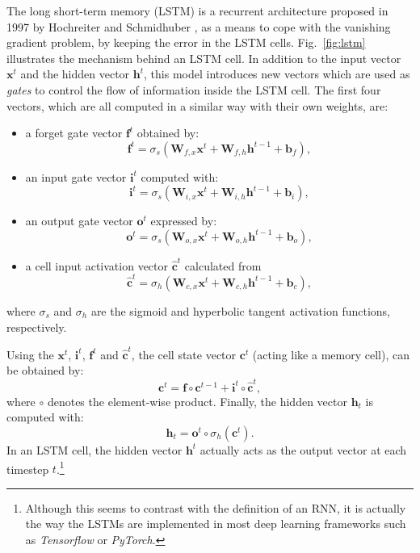 The long short-term memory (LSTM) is a recurrent architecture proposed in 1997 by Hochreiter and Schmidhuber \cite{hochreiter_long_1997}, as a means to cope with the vanishing gradient problem, by keeping the error in the LSTM cells. Fig.~\ref{fig:lstm} illustrates the mechanism behind an LSTM cell. In addition to the input vector $\mathbf{x}^t$ and the hidden vector $\mathbf{h}^t$, this model introduces new vectors which are used as \textit{gates} to control the flow of information inside the LSTM cell. The first four vectors, which are all computed in a similar way with their own weights, are:
\begin{itemize}
    \item a forget gate vector $\mathbf{f}^t$ obtained by:
    \begin{equation}
        \mathbf{f}^t = \sigma_s(\mathbf{W}_{f,x} \mathbf{x}^t + \mathbf{W}_{f,h} \mathbf{h}^{t-1} + \mathbf{b}_f),
    \end{equation}
    
    \item an input gate vector $\mathbf{i}^t$ computed with:
    \begin{equation}
        \mathbf{i}^t = \sigma_s(\mathbf{W}_{i,x} \mathbf{x}^t + \mathbf{W}_{i,h} \mathbf{h}^{t-1} + \mathbf{b}_i),
    \end{equation}
    
    \item an output gate vector $\mathbf{o}^t$ expressed by:
    \begin{equation}
        \mathbf{o}^t = \sigma_s(\mathbf{W}_{o,x} \mathbf{x}^t + \mathbf{W}_{o,h} \mathbf{h}^{t-1} + \mathbf{b}_o),
    \end{equation}
    
    \item a cell input activation vector $\mathbf{\hat{c}}^t$ calculated from
    \begin{equation}
        \mathbf{\hat{c}}^t = \sigma_h(\mathbf{W}_{c,x} \mathbf{x}^t + \mathbf{W}_{c,h} \mathbf{h}^{t-1} + \mathbf{b}_c),
    \end{equation}
\end{itemize}
where $\sigma_s$ and $\sigma_h$ are the sigmoid and hyperbolic tangent activation functions, respectively. 

Using the $\mathbf{x}^t$, $\mathbf{i}^t$, $\mathbf{f}^t$ and $\mathbf{\hat{c}}^t$, the cell state vector $\mathbf{c}^t$ (acting like a memory cell), can be obtained by:
\begin{equation}
    \mathbf{c}^t = \mathbf{f} \circ \mathbf{c}^{t-1} + \mathbf{i}^t \circ \mathbf{\hat{c}}^t,
\end{equation}
where $\circ$ denotes the element-wise product.
Finally, the hidden vector $\mathbf{h}_t$ is computed with:
\begin{equation}
    \mathbf{h}_t = \mathbf{o}^t \circ \sigma_h(\mathbf{c}^t).
\end{equation}
In an LSTM cell, the hidden vector $\mathbf{h}^t$ actually acts as the output vector at each timestep $t$.\footnote{Although this seems to contrast with the definition of an RNN, it is actually the way the LSTMs are implemented in most deep learning frameworks such as \textit{Tensorflow} or \textit{PyTorch}.}

